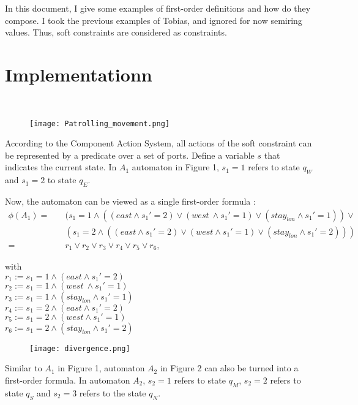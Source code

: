 \documentclass{article}
\begin{document}
In this document, I give some examples of first-order definitions and how do they compose. I took the previous examples of Tobias, and ignored for now semiring values. Thus, soft constraints are considered as constraints. 


\section{Implementationn} \hspace{0pt} \\

\begin{figure}[!h]
\centering
\texttt{[image: Patrolling\_movement.png]}
\end{figure}
\noindent
According to the Component Action System, all actions of the soft constraint can be represented by a predicate over a set of ports.
Define a variable $s$ that indicates the current state. In $A_1$ automaton in Figure 1, $s_1=1$ refers to state $q_W$ and $s_1=2$ to state $q_E$.

Now, the automaton can be viewed as a single first-order formula :
\begin{align*}
\phi(A_1) =  & \quad ( s_1=1 \land ((east\land s_1'=2) \lor (west\ \land s_1'=1) \lor (stay_{lon}\land s_1'=1)) \lor  \\
	&\quad(s_1=2 \land ((east \land s_1'=2) \lor (west \land s_1'= 1 )\lor (stay_{lon} \land s_1'=2))) \\
	  =  & \quad r_1 \lor r_2 \lor r_3 \lor r_4 \lor r_5 \lor r_6,
\end{align*}

\noindent
with\\ 
$r_1 := s_1=1 \land (east\land s_1'=2)$ \\ \quad
$r_2 := s_1=1 \land (west\ \land s_1'=1)$ \\ \quad
$r_3 := s_1=1 \land (stay_{lon}\land s_1'=1)$\\ \quad
$r_4 := s_1=2 \land (east \land s_1'=2)$ \\ \quad
$r_5 := s_1=2 \land (west \land s_1'= 1 )$\\ \quad
$r_6 := s_1=2 \land (stay_{lon} \land s_1'=2)$\\ \quad
\begin{figure}[!h]
\centering
\texttt{[image: divergence.png]}
\end{figure}

\noindent
Similar to $A_1$ in Figure 1, automaton $A_2$ in Figure 2 can also be turned into a first-order formula. In automaton $A_2$, $s_2=1$ refers to state $q_M$, $s_2=2$ refers to state $q_S$ and $s_2=3$ refers to the state $q_N$.
\end{document}
